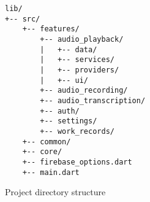 \documentclass[
  digital,     %
  oneside,     %
  nosansbold,  %
  nocolorbold, %
  lof,         %
  lot,         %
]{fithesis4}
\begin{document}
\begin{figure}[h]
  \begin{center}
    \begin{minipage}{.8\textwidth}
      \begin{verbatim}
lib/
+-- src/
    +-- features/
        +-- audio_playback/
        |   +-- data/
        |   +-- services/
        |   +-- providers/
        |   +-- ui/
        +-- audio_recording/
        +-- audio_transcription/
        +-- auth/
        +-- settings/
        +-- work_records/
    +-- common/
    +-- core/
    +-- firebase_options.dart
    +-- main.dart
      \end{verbatim}
    \end{minipage}
  \end{center}
  \caption{Project directory structure}
  \label{fig:project_directory}
\end{figure}
\end{document}
